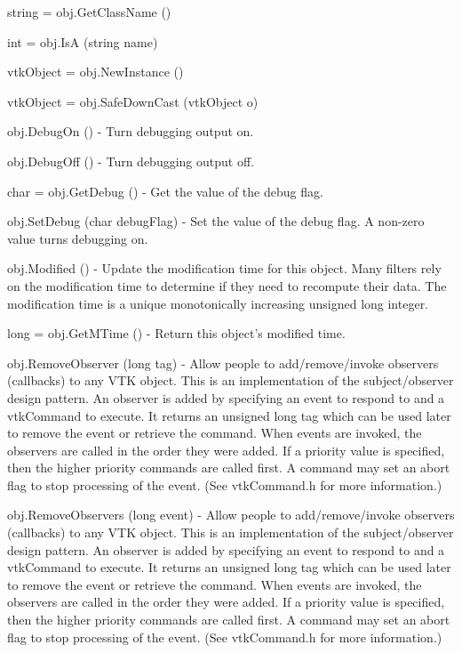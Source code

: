 \begin{DoxyItemize}
\item {\ttfamily string = obj.\-Get\-Class\-Name ()}  
\item {\ttfamily int = obj.\-Is\-A (string name)}  
\item {\ttfamily vtk\-Object = obj.\-New\-Instance ()}  
\item {\ttfamily vtk\-Object = obj.\-Safe\-Down\-Cast (vtk\-Object o)}  
\item {\ttfamily obj.\-Debug\-On ()} -\/ Turn debugging output on.  
\item {\ttfamily obj.\-Debug\-Off ()} -\/ Turn debugging output off.  
\item {\ttfamily char = obj.\-Get\-Debug ()} -\/ Get the value of the debug flag.  
\item {\ttfamily obj.\-Set\-Debug (char debug\-Flag)} -\/ Set the value of the debug flag. A non-\/zero value turns debugging on.  
\item {\ttfamily obj.\-Modified ()} -\/ Update the modification time for this object. Many filters rely on the modification time to determine if they need to recompute their data. The modification time is a unique monotonically increasing unsigned long integer.  
\item {\ttfamily long = obj.\-Get\-M\-Time ()} -\/ Return this object's modified time.  
\item {\ttfamily obj.\-Remove\-Observer (long tag)} -\/ Allow people to add/remove/invoke observers (callbacks) to any V\-T\-K object. This is an implementation of the subject/observer design pattern. An observer is added by specifying an event to respond to and a vtk\-Command to execute. It returns an unsigned long tag which can be used later to remove the event or retrieve the command. When events are invoked, the observers are called in the order they were added. If a priority value is specified, then the higher priority commands are called first. A command may set an abort flag to stop processing of the event. (See vtk\-Command.\-h for more information.)  
\item {\ttfamily obj.\-Remove\-Observers (long event)} -\/ Allow people to add/remove/invoke observers (callbacks) to any V\-T\-K object. This is an implementation of the subject/observer design pattern. An observer is added by specifying an event to respond to and a vtk\-Command to execute. It returns an unsigned long tag which can be used later to remove the event or retrieve the command. When events are invoked, the observers are called in the order they were added. If a priority value is specified, then the higher priority commands are called first. A command may set an abort flag to stop processing of the event. (See vtk\-Command.\-h for more information.)  

\end{DoxyItemize}
